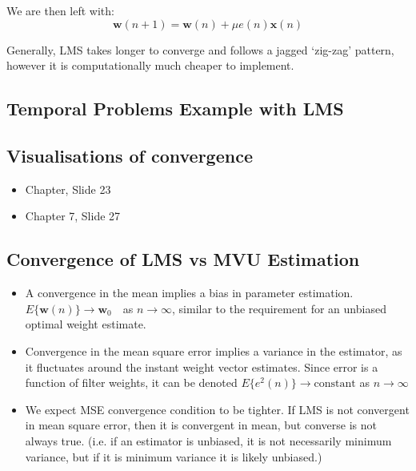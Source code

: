 We are then left with:
\begin{equation}
    \mathbf{w}(n+1)=\mathbf{w}(n)+\mu e(n)\mathbf{x}(n)
\end{equation}

Generally, LMS takes longer to converge and follows a jagged `zig-zag' pattern, however it is computationally much cheaper to implement.

\subsection{Temporal Problems Example with LMS}
\subsection{Visualisations of convergence}
\begin{itemize}
    \item Chapter, Slide 23
    \item Chapter 7, Slide 27
\end{itemize}

\subsection{Convergence of LMS vs MVU Estimation}
\begin{itemize}
    \item A convergence in the mean implies a bias in parameter estimation. $E\{\mathbf{w}(n)\}\to\mathbf{w}_0\quad $as $ n\to\infty $, similar to the requirement for an unbiased optimal weight estimate.
    \item Convergence in the mean square error implies a variance in the estimator, as it fluctuates around the instant weight vector estimates. Since error is a function of filter weights, it can be denoted $E\{e^2(n)\} \to \text{constant}$ as $n \to \infty$
    \item We expect MSE convergence condition to be tighter. If LMS is not convergent in mean square error, then it is convergent in mean, but converse is not always true. (i.e. if an estimator is unbiased, it is not necessarily minimum variance, but if it is minimum variance it is likely unbiased.)
\end{itemize}



